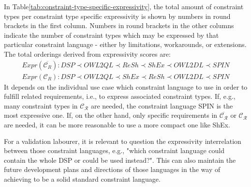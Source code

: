 \documentclass{llncs}
\newcommand{\er}[1]{\todo[size=\small, color=red!40]{\textbf{Erman:} #1}}
\begin{document}
In Table\ref{tab:constraint-type-specific-expressivity}, the total amount of constraint types per constraint type specific expressivity is shown by numbers in round brackets in the first column.
Numbers in round brackets in the other columns indicate the number of constraint types which may be expressed by that particular constraint language - either by limitations, workarounds, or extensions.  
The total orderings derived from expressivity scores are:
\begin{eqnarray*}
Expr(\overline{\mathcal{C}_R}): DSP \prec OWL2QL \prec ReSh \prec ShEx \prec OWL2DL \prec SPIN \\
Expr(\mathcal{C}_R): DSP \prec OWL2QL \prec ShEx \prec ReSh \prec OWL2DL \prec SPIN
\end{eqnarray*}
It depends on the individual use case which constraint language to use in order to fulfill related requirements, i.e., to express associated constraint types.
If, e.g., many constraint types in $\mathcal{C_R}$ are needed, the constraint language SPIN is the most expressive one.
If, on the other hand, only specific requirements in $\overline{\mathcal{C_R}}$ or $\mathcal{C_R}$ are needed, 
it can be more reasonable to use a more compact one like ShEx.

For a validation labourer, it is relevant to question the expressivity interrelation between those constraint languages, e.g., "which constraint language could contain the whole DSP or  could be used instead?". This can also maintain the future development plans and directions of those languages in the way of achieving to be a solid standard constraint language.
\end{document}
